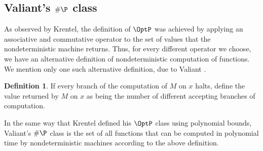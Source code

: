 \documentclass[12pt]{article}
\theoremstyle{definition}
\newtheorem{definition}{Definition}
\begin{document}
\subsection{Valiant's $\#\P$ class}

As observed by Krentel,
the definition of $\OptP$ was achieved by applying
an associative and commutative operator to the set of values
that the nondeterministic machine returns.
Thus,
for every different operator we choose,
we have an alternative definition of nondeterministic computation of functions.
We mention only one such alternative definition,
due to Valiant \cite{Valiant1979}.

\begin{definition}
    If every branch of the computation of $M$ on $x$ halts,
    define the value returned by $M$ on $x$
    as being the number of different accepting branches of computation.
\end{definition}

In the same way that Krentel defined his $\OptP$ class using polynomial bounds,
Valiant's $\#\P$ class is the set of all functions
that can be computed in polynomial time by nondeterministic machines
according to the above definition.



\end{document}
